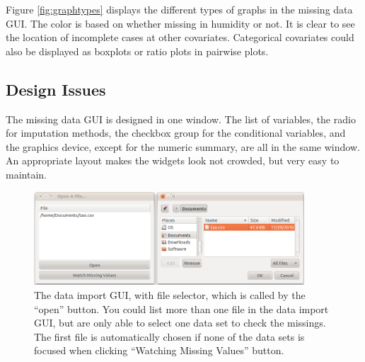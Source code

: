 \documentclass[english]{article}
\begin{document}
Figure \ref{fig:graphtypes} displays the different types of graphs in the missing data GUI. The color is based on whether missing in humidity or not. It is clear to see the location of incomplete cases at other covariates. Categorical covariates could also be displayed as boxplots or ratio plots in pairwise plots. 

\subsection{Design Issues}



The missing data GUI is designed in one window. The list of variables, the radio for imputation methods, the checkbox group for the conditional variables, and the graphics device, except for the numeric summary, are all in the same window. An appropriate layout makes the widgets look not crowded, but very easy to maintain. 

\begin{center}
%
\begin{figure}[h]
\begin{centering}
\includegraphics[width=0.9\textwidth]{Miss_fig6}
\par\end{centering}

\caption{\label{fig: import}{The data import GUI, with file selector, which is called by the ``open'' button. You could list more than one file in the data import GUI, but are only able to select one data set to check the missings. The first file is automatically chosen if none of the data sets is focused when clicking ``Watching Missing Values'' button. }}

\end{figure}

\par\end{center}
\end{document}
